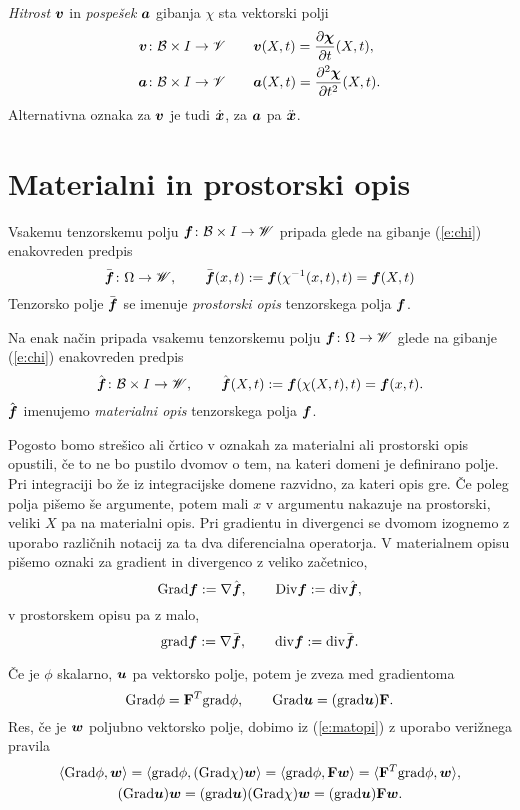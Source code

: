 \emph{Hitrost} $\boldsymbol v$ in \emph{pospešek} $\boldsymbol a$ gibanja $\chi$ sta vektorski polji
\begin{align}
	\boldsymbol v\colon \mathcal B\times I\to \mathscr V \qquad & \boldsymbol v(X,t) = \frac{\partial\boldsymbol \chi}{\partial t}(X,t), \label{e:v} \\
	\boldsymbol a\colon \mathcal B\times I\to \mathscr V \qquad & \boldsymbol a(X,t) = \frac{\partial^2\boldsymbol \chi}{\partial t^2}(X,t). \label{e:a}
\end{align}
Alternativna oznaka za $\boldsymbol v$ je tudi $\dot{\boldsymbol x}$, za $\boldsymbol a$ pa $\ddot{\boldsymbol x}$.


\section{Materialni in prostorski opis}


Vsakemu tenzorskemu polju $\boldsymbol f\colon \mathcal B\times I\to\mathscr W$ pripada glede na gibanje
(\ref{e:chi}) enakovreden predpis
\[
	\bar{\boldsymbol f}\colon\Omega\to\mathscr W,\qquad
	\bar{\boldsymbol f}(x,t):=\boldsymbol f(\chi^{-1}(x,t),t)=\boldsymbol f(X,t)
\]
Tenzorsko polje $\bar{\boldsymbol f}$ se imenuje \emph{prostorski opis} tenzorskega polja $\boldsymbol f$.

Na enak način pripada vsakemu tenzorskemu polju $\boldsymbol f\colon\Omega\to\mathscr W$
glede na gibanje (\ref{e:chi}) enakovreden predpis
\begin{equation} \label{e:matopi}
	\hat{\boldsymbol f}\colon \mathcal B\times I\to\mathscr W,\qquad
	\hat{\boldsymbol f}(X,t):=\boldsymbol f(\chi(X,t),t)=\boldsymbol f(x,t).
\end{equation}
$\hat{\boldsymbol f}$ imenujemo \emph{materialni opis} tenzorskega polja $\boldsymbol f$.

Pogosto bomo strešico ali črtico v oznakah za materialni ali prostorski opis opustili,
če to ne bo pustilo dvomov o tem, na kateri domeni je definirano polje.
Pri integraciji bo že iz integracijske domene razvidno, za kateri opis gre.
Če poleg polja pišemo še argumente, potem mali $x$ v argumentu nakazuje na prostorski,
veliki $X$ pa na materialni opis.
Pri gradientu in divergenci se dvomom izognemo z uporabo različnih notacij
za ta dva diferencialna operatorja.
V materialnem opisu pišemo oznaki za gradient in divergenco z veliko začetnico,
\[ \mathrm{Grad}\boldsymbol f:=\nabla\hat{\boldsymbol f},\qquad \mathrm {Div}\boldsymbol f:=\mathrm{div}\hat{\boldsymbol f}, \]
v prostorskem opisu pa z malo,
\[ \mathrm{grad}\boldsymbol f:=\nabla\bar{\boldsymbol f},\qquad \mathrm{div}\boldsymbol f:=\mathrm{div}\bar{\boldsymbol f}. \]

Če je $\phi$ skalarno, $\boldsymbol u$ pa vektorsko polje, potem je zveza med gradientoma
\begin{equation}\label{e:gz}
	\mathrm{Grad}\phi=\mathbf F^{T}\mathrm{grad}\phi,\qquad \mathrm{Grad}\boldsymbol u=(\mathrm{grad}\boldsymbol u)\mathbf F.
\end{equation}
Res, če je $\boldsymbol w$ poljubno vektorsko polje, dobimo iz (\ref{e:matopi})
z uporabo verižnega pravila
\begin{gather*}
	\langle\mathrm{Grad}\phi,\boldsymbol w\rangle=\langle\mathrm{grad}\phi,(\mathrm{Grad}\chi)\boldsymbol w\rangle=
	\langle\mathrm{grad}\phi, \mathbf F\boldsymbol w\rangle=\langle\mathbf F^{T}\mathrm{grad}\phi,\boldsymbol w\rangle, \\
	(\mathrm{Grad}\boldsymbol u)\boldsymbol w=(\mathrm{grad}\boldsymbol u)(\mathrm{Grad}\chi)\boldsymbol w
	=(\mathrm{grad}\boldsymbol u)\mathbf F\boldsymbol w.
\end{gather*}


